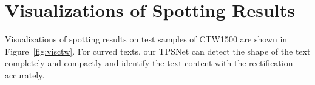 \documentclass[sigconf]{acmart}
\begin{document}
\section{Visualizations of Spotting Results}
	Visualizations of spotting results on test samples of CTW1500 are shown in Figure~\ref{fig:visctw}.  For curved texts, our TPSNet can detect the shape of the text completely and compactly and  identify the text content with the rectification accurately.
	
	
	
\end{document}
